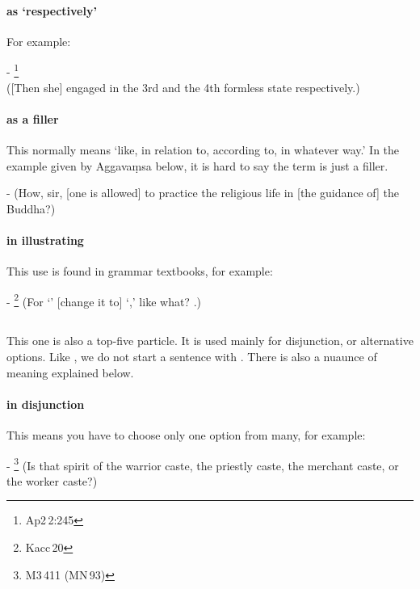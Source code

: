 \paragraph*{ as `respectively'} For example:\par
- \footnote{Ap2\,2:245} \\([Then she] engaged in the 3rd and the 4th formless state respectively.) \par
\paragraph*{ as a filler} 
This normally means `like, in relation to, according to, in whatever way.' In the example given by Aggava\d msa below, it is hard to say the term is just a filler.\par
-  (How, sir, [one is allowed] to practice the religious life in [the guidance of] the Buddha?) \par
\paragraph*{ in illustrating} This use is found in grammar textbooks, for example:\par
- \footnote{Kacc\,20} (For `' [change it to] `,' like what? .) \par

\subsection*{}\label{nip:vaa}
This one is also a top-five particle. It is used mainly for disjunction, or alternative options. Like , we do not start a sentence with . There is also a nuaunce of meaning explained below.
\paragraph*{ in disjunction} This means you have to choose only one option from many, for example:\par
- \footnote{M3\,411 (MN\,93)} (Is that spirit of the warrior caste, the priestly caste, the merchant caste, or the worker caste?) \par
